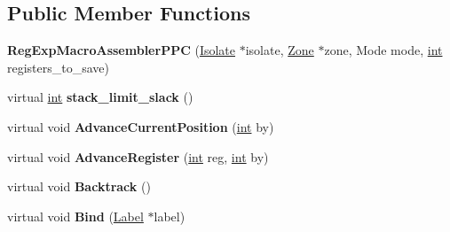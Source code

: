 \subsection*{Public Member Functions}
\begin{DoxyCompactItemize}
\item 
\mbox{\label{classv8_1_1internal_1_1RegExpMacroAssemblerPPC_aec5868d32cf4f274934958feb6fb7f3f}} 
{\bfseries Reg\+Exp\+Macro\+Assembler\+P\+PC} (\mbox{\hyperlink{classv8_1_1internal_1_1Isolate}{Isolate}} $\ast$isolate, \mbox{\hyperlink{classv8_1_1internal_1_1Zone}{Zone}} $\ast$zone, Mode mode, \mbox{\hyperlink{classint}{int}} registers\+\_\+to\+\_\+save)
\item 
\mbox{\label{classv8_1_1internal_1_1RegExpMacroAssemblerPPC_a429088763fcc481a4e6e66fb108f90f1}} 
virtual \mbox{\hyperlink{classint}{int}} {\bfseries stack\+\_\+limit\+\_\+slack} ()
\item 
\mbox{\label{classv8_1_1internal_1_1RegExpMacroAssemblerPPC_aea271e9d8f50c6127b5ac05770003bbd}} 
virtual void {\bfseries Advance\+Current\+Position} (\mbox{\hyperlink{classint}{int}} by)
\item 
\mbox{\label{classv8_1_1internal_1_1RegExpMacroAssemblerPPC_ab900592c59291eb3bd395581de467f90}} 
virtual void {\bfseries Advance\+Register} (\mbox{\hyperlink{classint}{int}} reg, \mbox{\hyperlink{classint}{int}} by)
\item 
\mbox{\label{classv8_1_1internal_1_1RegExpMacroAssemblerPPC_ac49f18f6f71645060cf488417fa31d7e}} 
virtual void {\bfseries Backtrack} ()
\item 
\mbox{\label{classv8_1_1internal_1_1RegExpMacroAssemblerPPC_afebbd8dcd5b125274fe5c6a1dd8f91ae}} 
virtual void {\bfseries Bind} (\mbox{\hyperlink{classv8_1_1internal_1_1Label}{Label}} $\ast$label)
\item 
\mbox{\label{classv8_1_1internal_1_1RegExpMacroAssemblerPPC_a40341a7d034d1f17e803eae8fd22644e}} 

\end{DoxyCompactItemize}
